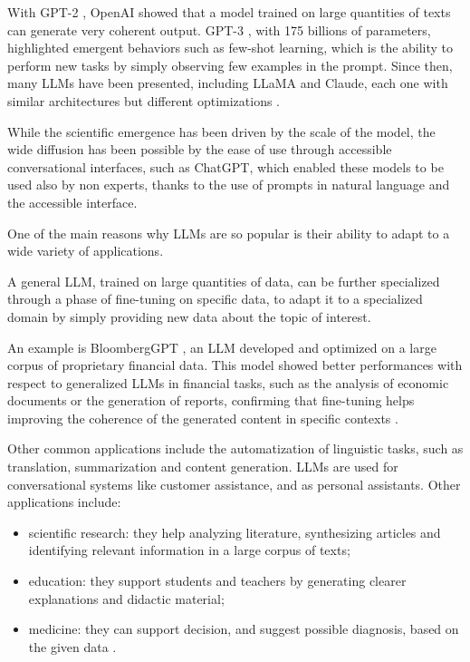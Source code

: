 \medskip
With GPT-2 \cite{radford2019language}, OpenAI showed that a model trained on large quantities of texts can generate very coherent output.
GPT-3 \cite{brown2020LMfewshot}, with 175 billions of parameters, highlighted emergent behaviors such as few-shot learning, which is the ability to perform new tasks by simply observing few examples in the prompt.
Since then, many LLMs have been presented, including LLaMA and Claude, each one with similar architectures but different optimizations \cite{wang2025llm}.

While the scientific emergence has been driven by the scale of the model, the wide diffusion has been possible by the ease of use through accessible conversational interfaces, such as ChatGPT, which enabled these models to be used also by non experts, thanks to the use of prompts in natural language and the accessible interface.

\medskip
One of the main reasons why LLMs are so popular is their ability to adapt to a wide variety of applications.

A general LLM, trained on large quantities of data, can be further specialized through a phase of fine-tuning on specific data, to adapt it to a specialized domain by simply providing new data about the topic of interest.

An example is BloombergGPT \cite{wu2023bloomberggptlargelanguagemodel}, an LLM developed and optimized on a large corpus of proprietary financial data. This model showed better performances with respect to generalized LLMs in financial tasks, such as the analysis of economic documents or the generation of reports, confirming that fine-tuning helps improving the coherence of the generated content in specific contexts \cite{wang2025llm}.

\medskip
Other common applications include the automatization of linguistic tasks, such as translation, summarization and content generation. LLMs are used for conversational systems like customer assistance, and as personal assistants.
Other applications include:
\begin{itemize}
    \item scientific research: they help analyzing literature, synthesizing articles and identifying relevant information in a large corpus of texts;
    \item education: they support students and teachers by generating clearer explanations and didactic material;
    \item medicine: they can support decision, and suggest possible diagnosis, based on the given data \cite{wang2025llm}.
\end{itemize}

